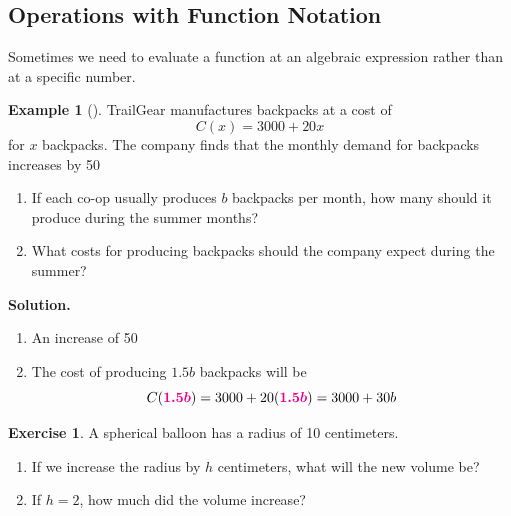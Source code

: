 \documentclass[10pt,]{book}
\theoremstyle{plain}
\theoremstyle{definition}
\theoremstyle{definition}
\newtheorem{example}[theorem]{Example}
\theoremstyle{definition}
\theoremstyle{definition}
\newtheorem{exercise}[theorem]{Exercise}
\numberwithin{equation}{part}
\newcommand{\alert}[1]{\boldsymbol{\color{magenta}{#1}}}
\begin{document}
\subsection[{Operations with Function Notation}]{Operations with Function Notation}\label{subsection-13}
Sometimes we need to evaluate a function at an algebraic expression rather than at a specific number.%
\begin{example}[]\label{example-backpacks}
TrailGear manufactures backpacks at a cost of%
\begin{equation*}
C(x) = 3000 + 20x
\end{equation*}
for \(x\) backpacks. The company finds that the monthly demand for backpacks increases by 50%
\leavevmode%
\begin{enumerate}[label=\alph*]
\item\hypertarget{li-303}{}If each co-op usually produces \(b\) backpacks per month, how many should it produce during the summer months?%
\item\hypertarget{li-304}{}What costs for producing backpacks should the company expect during the summer?%
\end{enumerate}
\par\medskip\noindent%
\textbf{Solution.}\quad \leavevmode%
\begin{enumerate}[label=\alph*]
\item\hypertarget{li-305}{}An increase of 50%
\item\hypertarget{li-306}{}The cost of producing \(1.5b\) backpacks will be%
\begin{equation*}
C(\alert{1.5b}) = 3000 + 20(\alert{1.5b}) = 3000 + 30b
\end{equation*}
%
\end{enumerate}
\end{example}
\begin{exercise}\label{exercise-spherical-balloon}
A spherical balloon has a radius of 10 centimeters. \leavevmode%
\begin{enumerate}[label=\alph*]
\item\hypertarget{li-307}{}If we increase the radius by \(h\) centimeters, what will the new volume be?%
\item\hypertarget{li-308}{}If \(h = 2\), how much did the volume increase?%
\end{enumerate}
\end{exercise}
\end{document}
